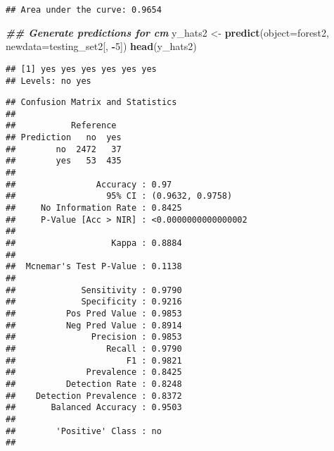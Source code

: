 \documentclass[
]{article}
\newenvironment{Shaded}{\begin{snugshade}}{\end{snugshade}}
\newcommand{\AttributeTok}[1]{\textcolor[rgb]{0.13,0.29,0.53}{#1}}
\newcommand{\DecValTok}[1]{\textcolor[rgb]{0.00,0.00,0.81}{#1}}
\newcommand{\DocumentationTok}[1]{\textcolor[rgb]{0.56,0.35,0.01}{\textbf{\textit{#1}}}}
\newcommand{\FunctionTok}[1]{\textcolor[rgb]{0.13,0.29,0.53}{\textbf{#1}}}
\newcommand{\NormalTok}[1]{#1}
\newcommand{\OtherTok}[1]{\textcolor[rgb]{0.56,0.35,0.01}{#1}}
\newcommand{\SpecialCharTok}[1]{\textcolor[rgb]{0.81,0.36,0.00}{\textbf{#1}}}
\newcommand{\StringTok}[1]{\textcolor[rgb]{0.31,0.60,0.02}{#1}}
\begin{document}
\begin{verbatim}
## Area under the curve: 0.9654
\end{verbatim}

\begin{Shaded}
\begin{Highlighting}[]
\DocumentationTok{\#\# Generate predictions for cm}
\NormalTok{y\_hats2 }\OtherTok{\textless{}{-}} \FunctionTok{predict}\NormalTok{(}\AttributeTok{object=}\NormalTok{forest2,  }\AttributeTok{newdata=}\NormalTok{testing\_set2[, }\SpecialCharTok{{-}}\DecValTok{5}\NormalTok{])}
\FunctionTok{head}\NormalTok{(y\_hats2)}
\end{Highlighting}
\end{Shaded}

\begin{verbatim}
## [1] yes yes yes yes yes yes
## Levels: no yes
\end{verbatim}

\begin{Shaded}
\end{Shaded}

\begin{verbatim}
## Confusion Matrix and Statistics
## 
##           Reference
## Prediction   no  yes
##        no  2472   37
##        yes   53  435
##                                              
##                Accuracy : 0.97               
##                  95% CI : (0.9632, 0.9758)   
##     No Information Rate : 0.8425             
##     P-Value [Acc > NIR] : <0.0000000000000002
##                                              
##                   Kappa : 0.8884             
##                                              
##  Mcnemar's Test P-Value : 0.1138             
##                                              
##             Sensitivity : 0.9790             
##             Specificity : 0.9216             
##          Pos Pred Value : 0.9853             
##          Neg Pred Value : 0.8914             
##               Precision : 0.9853             
##                  Recall : 0.9790             
##                      F1 : 0.9821             
##              Prevalence : 0.8425             
##          Detection Rate : 0.8248             
##    Detection Prevalence : 0.8372             
##       Balanced Accuracy : 0.9503             
##                                              
##        'Positive' Class : no                 
## 
\end{verbatim}
\end{document}
